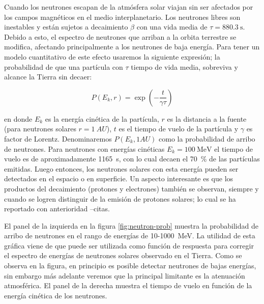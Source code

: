 Cuando los neutrones escapan de la atmósfera solar viajan sin ser afectados por los campos magnéticos en el medio interplanetario. Los neutrones libres son inestables y están sujetos a decaimiento $\beta$ con una vida media de $\tau=\SI{880.3}{\second}$. Debido a esto, el espectro de neutrones que arriban a la orbita terrestre se modifica, afectando principalmente a los neutrones de baja energía. Para tener un modelo cuantitativo de este efecto usaremos la siguiente expresión; la probabilidad de que una partícula con $\tau$ tiempo de vida media, sobreviva y alcance la Tierra sin decaer:

\begin{equation}
P\left(E_{k},r\right)=\exp\left(-\frac{t}{\gamma\tau}\right)
\end{equation}

en donde $E_{k}$ es la energía cinética de la partícula, $r$ es la distancia a la fuente (para neutrones solares $r=\SI{1}{AU}$), $t$ es el tiempo de vuelo de la partícula y $\gamma$ es factor de Lorentz. Denominaremos $P(E_{k},1AU)$ como la probabilidad de arribo de neutrones. Para neutrones con energías cinéticas $E_{k}=\SI{100}{\mega\electronvolt}$ el tiempo de vuelo es de aproximadamente \SI{1165}{\second}, con lo cual decaen el \SI{70}{\percent} de las partículas emitidas. Luego entonces, los neutrones solares con esta energía pueden ser detectados en el espacio o en superficie. Un aspecto interesante es que los productos del decaimiento (protones y electrones) también se observan, siempre y cuando se logren distinguir de la emisión de protones solares; lo cual se ha reportado con anterioridad --citas.

El panel de la izquierda en la figura \ref{fig:neutron-prob} muestra la probabilidad de arribo de neutrones en el rango de energías de \num{10}-\SI{1000}{\mega\electronvolt}. La utilidad de esta gráfica viene de que puede ser utilizada como función de respuesta para corregir el espectro de energías de neutrones solares observado en el Tierra. Como se observa en la figura, en principio es posible detectar neutrones de bajas energías, sin embargo más adelante veremos que la principal limitante es la atenuación atmosférica. El panel de la derecha muestra el tiempo de vuelo en función de la energía cinética de los neutrones.

